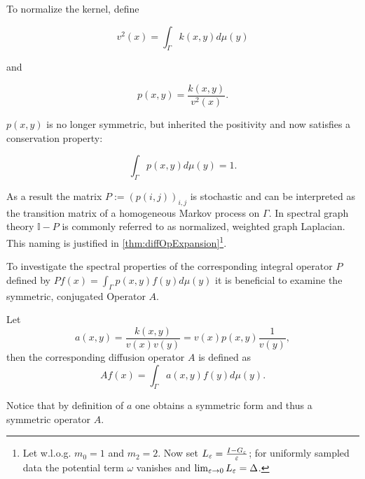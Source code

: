 To normalize the kernel, define
\begin{definition}\label{def:normFunc}
$$v^2(x)=\int_\Gamma k(x,y)d\mu(y)$$
\end{definition}
and
\begin{definition}
$$p(x,y)=\frac{k(x,y)}{v^2(x)}.$$
\end{definition}
$p(x,y)$ is no longer symmetric, but inherited the positivity and now satisfies a conservation property:

\begin{equation*}
\int_\Gamma p(x,y)d\mu(y)=1.
\end{equation*}

As a result the matrix $P:=(p(i,j))_{i,j}$ is stochastic and can be interpreted as the transition matrix of a homogeneous Markov process on $\Gamma$. In spectral graph theory $\mathbb{I}-P$ is commonly referred to as normalized, weighted graph Laplacian. This naming is justified in \ref{thm:diffOpExpansion}\footnote{Let w.l.o.g. $m_0=1$ and $m_2=2$. Now set $L_\varepsilon = \frac{I - G_\varepsilon}{\varepsilon}$; for uniformly sampled data the potential term $\omega$ vanishes and $\lim_{\varepsilon\rightarrow 0} L_\varepsilon = \Delta$.}.

To investigate the spectral properties of the corresponding integral operator $P$ defined by $Pf(x)=\int_\Gamma p(x,y)f(y)d\mu(y)$ it is beneficial to examine the symmetric, conjugated Operator $A$.

\begin{definition}
Let $$a(x,y)=\frac{k(x,y)}{v(x)v(y)}=v(x)p(x,y)\frac{1}{v(y)},$$ then the corresponding diffusion operator $A$ is defined as $$Af(x)=\int_\Gamma a(x,y)f(y)d\mu(y).$$
\end{definition}

Notice that by definition of $a$ one obtains a symmetric form and thus a symmetric operator $A$.

